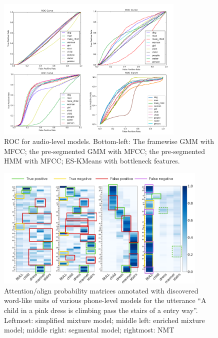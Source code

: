 \documentclass[journal]{IEEEtran}
\begin{document}
\begin{figure}
    \centering
    \includegraphics[width=0.8\textwidth]{fig_4.png}
    \caption{ROC for audio-level models. Bottom-left: The framewise GMM with MFCC; the pre-segmented GMM with MFCC; the pre-segmented HMM with MFCC; ES-KMeans with bottleneck features.}
    \label{fig:roc_audio}
\end{figure}

\begin{figure}[t]
    \centering
    \includegraphics[width=0.9\textwidth]{fig_8.png}
    \caption{Attention/align probability matrices annotated with discovered word-like units of various phone-level models for the utterance ``A child in a pink dress is climbing pass the stairs of a entry way''. Leftmost: simplified mixture model; middle left: enriched mixture model; middle right: segmental model; rightmost: NMT}
    \label{fig:attention_plots}
\end{figure}
\end{document}
